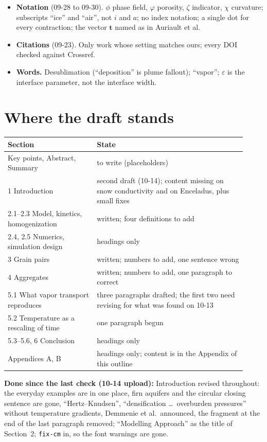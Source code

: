 \documentclass[11pt]{article}
\begin{document}
\begin{itemize}
  ``rise from day 1'' is never quoted as a property of the ice.
\item \textbf{Notation} (09-28 to 09-30). $\phi$ phase field, $\varphi$
  porosity, $\zeta$ indicator, $\chi$ curvature; subscripts ``ice'' and
  ``air'', not $i$ and $a$; no index notation; a single dot for every
  contraction; the vector $\mathbf{t}$ named as in Auriault et al.
\item \textbf{Citations} (09-23). Only work whose setting matches ours;
  every DOI checked against Crossref.
\item \textbf{Words.} Desublimation (``deposition'' is plume fallout);
  ``vapor''; $\varepsilon$ is the interface parameter, not the interface
  width.
\end{itemize}

\section*{Where the draft stands}

\begin{center}\begin{tabular}{p{0.34\linewidth}p{0.58\linewidth}}\toprule
Section & State\\\midrule
Key points, Abstract, Summary & to write (placeholders)\\
1 Introduction & second draft (10-14); content missing on snow conductivity and on Enceladus, plus small fixes\\
2.1--2.3 Model, kinetics, homogenization & written; four definitions to add\\
2.4, 2.5 Numerics, simulation design & headings only\\
3 Grain pairs & written; numbers to add, one sentence wrong\\
4 Aggregates & written; numbers to add, one paragraph to correct\\
5.1 What vapor transport reproduces & three paragraphs drafted; the first two need revising for what was found on 10-13\\
5.2 Temperature as a rescaling of time & one paragraph begun\\
5.3--5.6, 6 Conclusion & headings only\\
Appendices A, B & headings only; content is in the Appendix of this outline\\\bottomrule
\end{tabular}\end{center}

\textbf{Done since the last check (10-14 upload):} Introduction revised
throughout: the everyday examples are in one place, firn aquifers and the
circular closing sentence are gone, ``Hertz--Knudsen'', ``densification
\ldots\ overburden pressures'' without temperature gradients, Demmenie et
al.\ announced, the fragment at the end of the last paragraph removed;
``Modelling Approach'' as the title of Section~2; \verb|fix-cm| in, so the
font warnings are gone.
\end{document}
